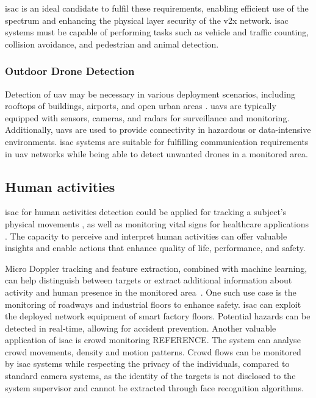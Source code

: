 	\gls{isac} is an ideal candidate to fulfil these requirements, enabling efficient use of the spectrum and enhancing the physical layer security of the \gls{v2x} network.
	\gls{isac} systems must be capable of performing tasks such as vehicle and traffic counting, collision avoidance, and pedestrian and animal detection.
	
	\subsubsection{Outdoor Drone Detection}
	
	Detection of \gls{uav} may be necessary in various deployment scenarios, including rooftops of buildings, airports, and open urban areas \cite{Mandelli_Henninger_Bauhofer_Wild_2023}.
	\glspl{uav} are typically equipped with sensors, cameras, and radars for surveillance and monitoring. Additionally, \glspl{uav} are used to provide connectivity in hazardous or data-intensive environments.
	\gls{isac} systems are suitable for fulfilling communication requirements in \gls{uav} networks while being able to detect unwanted drones in a monitored area.
	
	\subsection{Human activities}
	
	\Gls{isac} for human activities detection could be applied for tracking a subject's physical movements \cite{wifi_human_detection}, as well as monitoring vital signs for healthcare applications \cite{vital_signs_monitoring}. 
	The capacity to perceive and interpret human activities can offer valuable insights and enable actions that enhance quality of life, performance, and safety.
	
	Micro Doppler tracking and feature extraction, combined with machine learning, can help distinguish between targets or extract additional information about activity and human presence in the monitored area~\cite{Zhao_tracking_identifying_people_mmWave}.	
	One such use case is the monitoring of roadways and industrial floors to enhance safety. \Gls{isac} can exploit the deployed network equipment of smart factory floors. Potential hazards can be detected in real-time, allowing for accident prevention. 
	Another valuable application of \gls{isac} is crowd monitoring \alert{REFERENCE}. 
	The system can analyse crowd movements, density and motion patterns. 
	Crowd flows can be monitored by \gls{isac} systems while respecting the privacy of the individuals, compared to standard camera systems, as the identity of the targets is not disclosed to the system supervisor and cannot be extracted through face recognition algorithms.

